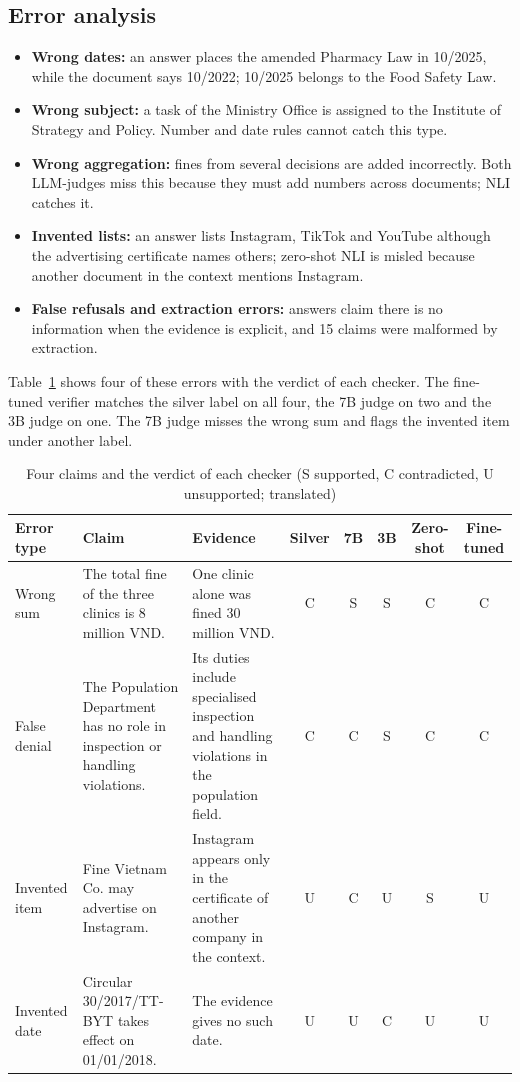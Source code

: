 \documentclass[conference]{IEEEtran}
\begin{document}
\subsection{Error analysis}
\begin{itemize}
\item \textbf{Wrong dates:} an answer places the amended Pharmacy Law in 10/2025, while the document says 10/2022; 10/2025 belongs to the Food Safety Law.
\item \textbf{Wrong subject:} a task of the Ministry Office is assigned to the Institute of Strategy and Policy. Number and date rules cannot catch this type.
\item \textbf{Wrong aggregation:} fines from several decisions are added incorrectly. Both LLM-judges miss this because they must add numbers across documents; NLI catches it.
\item \textbf{Invented lists:} an answer lists Instagram, TikTok and YouTube although the advertising certificate names others; zero-shot NLI is misled because another document in the context mentions Instagram.
\item \textbf{False refusals and extraction errors:} answers claim there is no information when the evidence is explicit, and 15 claims were malformed by extraction.
\end{itemize}

Table~\ref{tab:cases} shows four of these errors with the verdict of each checker. The fine-tuned verifier matches the silver label on all four, the 7B judge on two and the 3B judge on one. The 7B judge misses the wrong sum and flags the invented item under another label.

\begin{table}[t]
\caption{Four claims and the verdict of each checker (S supported, C contradicted, U unsupported; translated)}
\label{tab:cases}
\centering
\footnotesize
\begin{tabular}{p{}p{}p{}ccccc}
\toprule
Error type & Claim & Evidence & Silver & 7B & 3B & Zero-shot & Fine-tuned \\
\midrule
Wrong sum & The total fine of the three clinics is 8 million VND. & One clinic alone was fined 30 million VND. & C & S & S & C & C \\
False denial & The Population Department has no role in inspection or handling violations. & Its duties include specialised inspection and handling violations in the population field. & C & C & S & C & C \\
Invented item & Fine Vietnam Co. may advertise on Instagram. & Instagram appears only in the certificate of another company in the context. & U & C & U & S & U \\
Invented date & Circular 30/2017/TT-BYT takes effect on 01/01/2018. & The evidence gives no such date. & U & U & C & U & U \\
\bottomrule
\end{tabular}
\end{table}
\end{document}
